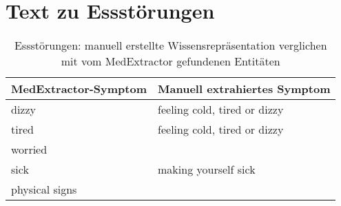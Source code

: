 \section{Text zu Essstörungen}
\label{sec:eatingdisorders} 

\begin{table}[H]
\begin{center}
\begin{tabular}{ll}
\toprule
  MedExtractor-Symptom &                       Manuell extrahiertes Symptom \\
\midrule
              dizzy & feeling cold, tired or dizzy \\
               tired & feeling cold, tired or dizzy \\
             worried &                              \\
                sick &         making yourself sick \\
      physical signs &                              \\
\bottomrule
\end{tabular}
\caption{Essstörungen: manuell erstellte Wissensrepräsentation verglichen mit vom MedExtractor gefundenen Entitäten}
\label{tab:eatingdisorders_vergleich_manuell_medextractor}
\end{center}
\end{table}


